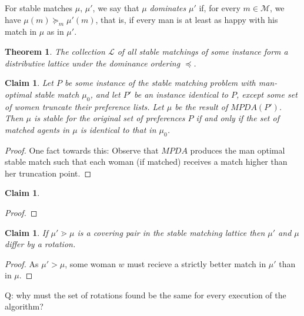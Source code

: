 \documentclass[12pt]{article}
\newcommand{\M}{\mathcal{M}}
\renewcommand{\L}{\mathcal{L}}
\newtheorem{theorem}[definition]{Theorem}
\newtheorem{claim}[definition]{Claim}
\begin{document}
  For stable matches $\mu$, $\mu'$, we say that $\mu$ \emph{dominates} $\mu'$
  if, for every $m\in\M$, we have $\mu(m)\succeq_m \mu'(m)$,
  that is, if every man is at least as happy with his match in $\mu$
  as in $\mu'$.

  \begin{theorem}
    The collection $\L$ of all stable matchings of some instance
    form a distributive lattice under the dominance ordering $\preceq$.
  \end{theorem}

  \begin{claim}
    Let $P$ be some instance of the stable matching problem
    with man-optimal stable match $\mu_0$, and let
    $P'$ be an instance identical to $P$, except some set of women truncate
    their preference lists. Let $\mu$ be the result of $MPDA(P')$.
    Then $\mu$ is stable for the original set of preferences $P$ if and only if
    the set of matched agents in $\mu$ is identical to that in $\mu_0$.
  \end{claim}
  \begin{proof}
    One fact towards this:
    Observe that $MPDA$ produces the man optimal stable match such that each
    woman (if matched) receives a match higher than her truncation point.
  \end{proof}
  \begin{claim}

  \end{claim}
  \begin{proof}
  \end{proof}
  \begin{claim}
    If $\mu' \gtrdot \mu$ is a covering pair in the stable matching lattice
    then $\mu'$ and $\mu$ differ by a rotation.
  \end{claim}
  \begin{proof}
    As $\mu' > \mu$, some woman $w$ must recieve a strictly better match in
    $\mu'$ than in $\mu$.
  \end{proof}

  Q: why must the set of rotations found be the same for every execution of the
  algorithm?
\end{document}
